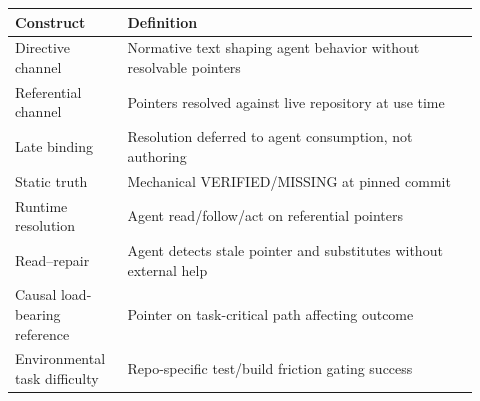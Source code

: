 \begin{tabular}{@{}p{0.22\linewidth}p{0.70\linewidth}@{}}
\toprule
\textbf{Construct} & \textbf{Definition} \\
\midrule
Directive channel & Normative text shaping agent behavior without resolvable pointers \\
Referential channel & Pointers resolved against live repository at use time \\
Late binding & Resolution deferred to agent consumption, not authoring \\
Static truth & Mechanical VERIFIED/MISSING at pinned commit \\
Runtime resolution & Agent read/follow/act on referential pointers \\
Read--repair & Agent detects stale pointer and substitutes without external help \\
Causal load-bearing reference & Pointer on task-critical path affecting outcome \\
Environmental task difficulty & Repo-specific test/build friction gating success \\
\bottomrule
\end{tabular}
